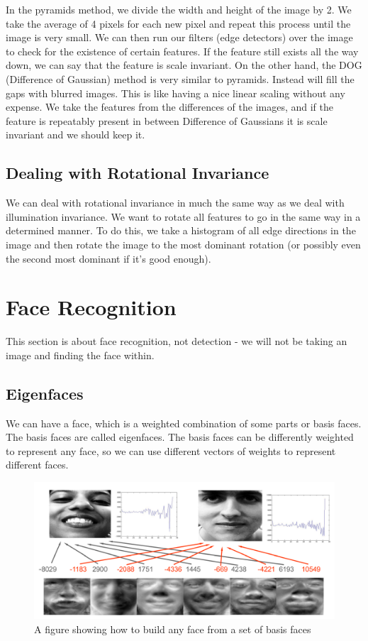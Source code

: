 \documentclass{article}
\begin{document}
	\par	 
	 In the pyramids method, we divide the width and height of the image by 2. We take the average of 4 pixels for each new pixel and repeat this process until the image is very small. We can then run our filters (edge detectors) over the image to check for the existence of certain features. If the feature still exists all the way down, we can say that the feature is scale invariant. On the other hand, the DOG (Difference of Gaussian) method is very similar to pyramids. Instead will fill the gaps with blurred images. This is like having a nice linear scaling without any expense. We take the features from the differences of the images, and if the feature is repeatably present in between Difference of Gaussians it is scale invariant and we should keep it.
	
	\subsection{Dealing with Rotational Invariance}
		We can deal with rotational invariance in much the same way as we deal with illumination invariance. We want to rotate all features to go in the same way in a determined manner. To do this, we take a histogram of all edge directions in the image and then rotate the image to the most dominant rotation (or possibly even the second most dominant if it's good enough).
		
	\section{Face Recognition}
	This section is about face recognition, not detection - we will not be taking an image and finding the face within.
	
	\subsection{Eigenfaces}
	We can have a face, which is a weighted combination of some parts or basis faces. The basis faces are called eigenfaces. The basis faces can be differently weighted to represent any face, so we can use different vectors of weights to represent different faces.
	
	\begin{figure}[h]
		\centering
		\includegraphics[width=\textwidth]{eigenfaces}
		\caption{A figure showing how to build any face from a set of basis faces}
		\label{fig:eigenfaces}
	\end{figure}
	
\end{document}
